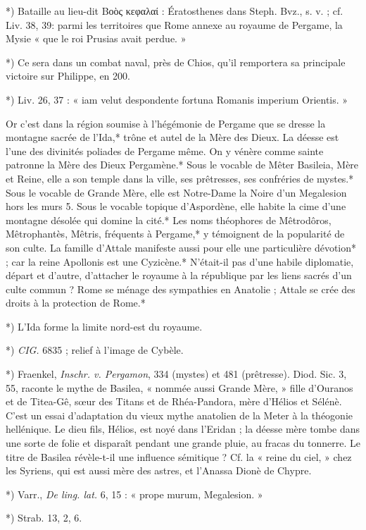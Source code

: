 \documentclass[a4paper, 11pt, oneside, polutonikogreek, french]{article}
\begin{document}
*) Bataille au lieu-dit Βοὸς κεφαλαί : Ératosthenes dans Steph. Bvz., s. v. ; cf. Liv. 38, 39: parmi les territoires que Rome annexe au royaume de Pergame, la Mysie « que le roi Prusias avait perdue. »

*) Ce sera dans un combat naval, près de Chios, qu'il remportera sa principale victoire sur Philippe, en 200.

*) Liv. 26, 37 : « iam velut despondente fortuna Romanis imperium Orientis. »

Or c'est dans la région soumise à l'hégémonie de Pergame que se dresse la montagne sacrée de l'Ida,* trône et autel de la Mère des Dieux. La déesse est l'une des divinités poliades de Pergame même. On y vénère comme sainte patronne la Mère des Dieux Pergamène.* Sous le vocable de Mêter Basileia, Mère et Reine, elle a son temple dans la ville, ses prêtresses, ses confréries de mystes.* Sous le vocable de Grande Mère, elle est Notre-Dame la Noire d'un Megalesion hors les murs 5. Sous le vocable topique d'Aspordène, elle habite la cime d'une montagne désolée qui domine la cité.* Les noms théophores de Mêtrodôros, Mêtrophantès, Mêtris, fréquents à Pergame,* y témoignent de la popularité de son culte. La famille d'Attale manifeste aussi pour elle une particulière dévotion* ; car la reine Apollonis est une Cyzicène.* N'était-il pas d'une habile diplomatie, départ et d'autre, d'attacher le royaume à la république par les liens sacrés d'un culte commun ? Rome se ménage des sympathies en Anatolie ; Attale se crée des droits à la protection de Rome.*

*) L'Ida forme la limite nord-est du royaume.

*) \emph{CIG.} 6835 ; relief à l'image de Cybèle.

*) Fraenkel, \emph{Inschr. v. Pergamon}, 334 (mystes) et 481 (prêtresse). Diod. Sic. 3, 55, raconte le mythe de Basilea, « nommée aussi Grande Mère, » fille d'Ouranos et de Titea-Gê, sœur des Titans et de Rhéa-Pandora, mère d'Hélios et Sélénè. C'est un essai d'adaptation du vieux mythe anatolien de la Meter à la théogonie hellénique. Le dieu fils, Hélios, est noyé dans l'Eridan ; la déesse mère tombe dans une sorte de folie et disparaît pendant une grande pluie, au fracas du tonnerre. Le titre de Basilea révèle-t-il une influence sémitique ? Cf. la « reine du ciel, » chez les Syriens, qui est aussi mère des astres, et l'Anassa Dionè de Chypre.

*) Varr., \emph{De ling. lat.} 6, 15 : « prope murum, Megalesion. »

*) Strab. 13, 2, 6.
\end{document}
